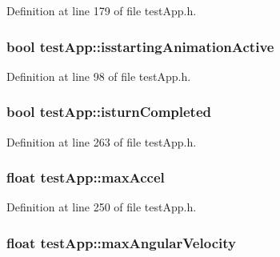 Definition at line 179 of file test\-App.\-h.

\hypertarget{classtest_app_ab8a277e1055730fb5d6786ce0c4804b2}{
\subsubsection[{isstarting\-Animation\-Active}]{\setlength{\rightskip}{0pt plus 5cm}bool test\-App\-::isstarting\-Animation\-Active}}\label{classtest_app_ab8a277e1055730fb5d6786ce0c4804b2}


Definition at line 98 of file test\-App.\-h.

\hypertarget{classtest_app_a42478a80a90ce9f663c04bcdaea5c5bd}{
\subsubsection[{isturn\-Completed}]{\setlength{\rightskip}{0pt plus 5cm}bool test\-App\-::isturn\-Completed}}\label{classtest_app_a42478a80a90ce9f663c04bcdaea5c5bd}


Definition at line 263 of file test\-App.\-h.

\hypertarget{classtest_app_a34e834a5e4d359700147a74eece8eed1}{
\subsubsection[{max\-Accel}]{\setlength{\rightskip}{0pt plus 5cm}float test\-App\-::max\-Accel}}\label{classtest_app_a34e834a5e4d359700147a74eece8eed1}


Definition at line 250 of file test\-App.\-h.

\hypertarget{classtest_app_ab9565e8e6dc748ef68e6845f5f94cae9}{
\subsubsection[{max\-Angular\-Velocity}]{\setlength{\rightskip}{0pt plus 5cm}float test\-App\-::max\-Angular\-Velocity}}\label{classtest_app_ab9565e8e6dc748ef68e6845f5f94cae9}


